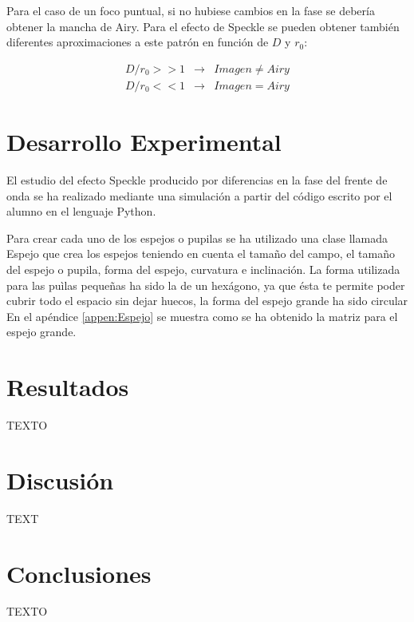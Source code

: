 \documentclass[twoside]{article}
\begin{document}
\begin{multicols}{2}
			Para el caso de un foco puntual, si no hubiese cambios en la fase se debería obtener la mancha de Airy. Para el efecto de Speckle se pueden obtener también diferentes aproximaciones a este patrón en función de $D$ y $r_0$:

				\begin{equation}
					\begin{matrix}
						D/r_0 >> 1 & \rightarrow & Imagen \neq Airy
						\\
						D/r_0 << 1 & \rightarrow & Imagen=Airy
					\end{matrix}
				\end{equation}

		\section{Desarrollo Experimental}

			El estudio del efecto Speckle producido por diferencias en la fase del frente de onda se ha realizado mediante una simulación a partir del código \cite{Speckle} escrito por el alumno en el lenguaje Python.

			Para crear cada uno de los espejos o pupilas se ha utilizado una clase llamada Espejo que crea los espejos teniendo en cuenta el tamaño del campo, el tamaño del espejo o pupila, forma del espejo, curvatura e inclinación. La forma utilizada para las puìlas pequeñas ha sido la de un hexágono, ya que ésta te permite poder cubrir todo el espacio sin dejar huecos, la forma del espejo grande ha sido circular En el apéndice \ref{appen:Espejo} se muestra como se ha obtenido la matriz para el espejo grande.

			


		\section{Resultados}

			TEXTO
		
		\section{Discusión}

			TEXT

		\section{Conclusiones}

			TEXTO

	\end{multicols}
\end{document}
